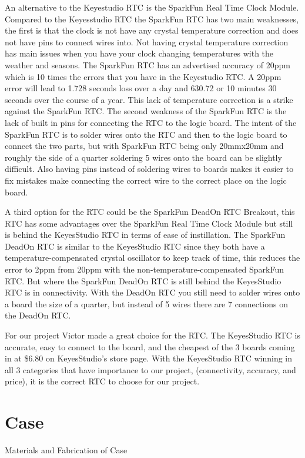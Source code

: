 \documentclass[10pt,draftclsnofoot,onecolumn]{IEEEtran}
\begin{document}
An alternative to the Keyestudio RTC is the SparkFun Real Time Clock Module. 
Compared to the Keyesstudio RTC the SparkFun RTC has two main weaknesses, the first is that the clock is not have any crystal temperature correction and does not have pins to connect wires into. 
Not having crystal temperature correction has main issues when you have your clock changing temperatures with the weather and seasons. 
The SparkFun RTC has an advertised accuracy of 20ppm which is 10 times the errors that you have in the Keyestudio RTC. 
A 20ppm error will lead to 1.728 seconds loss over a day and 630.72 or 10 minutes 30 seconds over the course of a year. 
This lack of temperature correction is a strike against the SparkFun RTC. 
The second weakness of the SparkFun RTC is the lack of built in pins for connecting the RTC to the logic board. 
The intent of the SparkFun RTC is to solder wires onto the RTC and then to the logic board to connect the two parts, but with SparkFun RTC being only 20mmx20mm and roughly the side of a quarter \cite{sfRTC} soldering 5 wires onto the board can be slightly difficult. 
Also having pins instead of soldering wires to boards makes it easier to fix mistakes make connecting the correct wire to the correct place on the logic board. 

A third option for the RTC could be the SparkFun DeadOn RTC Breakout, this RTC has some advantages over the SparkFun Real Time Clock Module but still is behind the KeyesStudio RTC in terms of ease of instillation. 
The SparkFun DeadOn RTC is similar to the KeyesStudio RTC since they both have a temperature-compensated crystal oscillator to keep track of time, this reduces the error to 2ppm \cite{sfDeadOn} from 20ppm with the non-temperature-compensated SparkFun RTC. 
But where the SparkFun DeadOn RTC is still behind the KeyesStudio RTC is in connectivity. 
With the DeadOn RTC you still need to solder wires onto a board the size of a quarter, but instead of 5 wires there are 7 connections on the DeadOn RTC. 

For our project Victor made a great choice for the RTC. 
The KeyesStudio RTC is accurate, easy to connect to the board, and the cheapest of the 3 boards coming in at \$6.80 on KeyesStudio’s store page. 
With the KeyesStudio RTC winning in all 3 categories that have importance to our project, (connectivity, accuracy, and price), it is the correct RTC to choose for our project. 

\newpage
\section{Case}
Materials and Fabrication of Case
\end{document}
